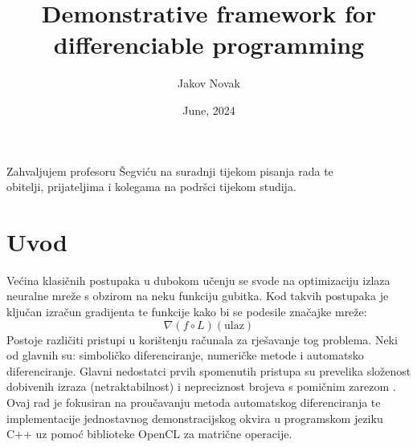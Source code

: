 \documentclass[zavrsnirad]{fer}
\title{Demonstrative framework for differenciable programming}
\author{Jakov Novak}
\date{June, 2024}
\begin{document}
\maketitle






\begin{zahvale}
  Zahvaljujem profesoru Šegviću na suradnji tijekom pisanja rada te\\ obitelji, prijateljima i kolegama na podršci tijekom studija.
\end{zahvale}


\mainmatter


\tableofcontents


\chapter{Uvod}
\label{pog:uvod}

Većina klasičnih postupaka u dubokom učenju se svode na optimizaciju izlaza neuralne mreže s obzirom na neku funkciju gubitka. Kod takvih postupaka je ključan izračun gradijenta te funkcije kako bi se podesile značajke mreže:
\begin{equation}
  \nabla (f \circ L) (\mathrm{ulaz})
\end{equation}
Postoje različiti pristupi u korištenju računala za rješavanje tog problema. Neki od glavnih su: simboličko diferenciranje, numeričke metode i automatsko diferenciranje. Glavni nedostatci prvih spomenutih pristupa su prevelika složenost dobivenih izraza (netraktabilnost) \cite{durrbaum2002comparison} i nepreciznost brojeva s pomičnim zarezom \cite{numerical}. Ovaj rad je fokusiran na proučavanju metoda automatskog diferenciranja te implementacije jednostavnog demonstracijskog okvira u programskom jeziku C++ uz pomoć biblioteke OpenCL za matrične operacije.
\end{document}
